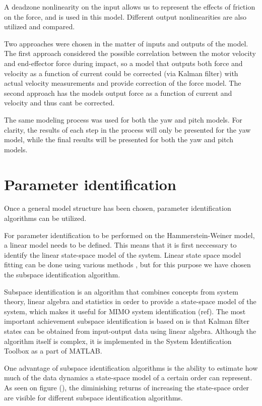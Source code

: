 A deadzone nonlinearity on the input allows us to represent the effects of friction on the force, and is used in this model.
Different output nonlinearities are also utilized and compared.

Two approaches were chosen in the matter of inputs and outputs of the model.
The first approach considered the possible correlation between the motor velocity and end-effector force during impact, so a model that outputs both force and velocity as a function of current could be corrected (via Kalman filter) with actual velocity measurements and provide correction of the force model.
The second approach has the models output force as a function of current and velocity and thus cant be corrected.

The same modeling process was used for both the yaw and pitch models.
For clarity, the results of each step in the process will only be presented for the yaw model, while the final results will be presented for both the yaw and pitch models.

\section{Parameter identification}
Once a general model structure has been chosen, parameter identification algorithms can be utilized.

For parameter identification to be performed on the Hammerstein-Weiner model, a linear model needs to be defined.
This means that it is first neccessary to identify the linear state-space model of the system.
Linear state space model fitting can be done using various methods , but for this purpose we have chosen the subspace identification algorithm.

Subspace identification is an algorithm that combines concepts from system theory, linear algebra and statistics in order to provide a state-space model of the system, which makes it useful for MIMO system identification (ref). 
The most important achievement subspace identification is based on is that Kalman filter states can be obtained from input-output data using linear algebra.
Although the algorithm itself is complex, it is implemented in the System Identification Toolbox as a part of MATLAB.

One advantage of subspace identification algorithms is the ability to estimate how much of the data dynamics a state-space model of a certain order can represent. 
As seen on figure (), the diminishing returns of increasing the state-space order are visible for different subspace identification algorithms.

